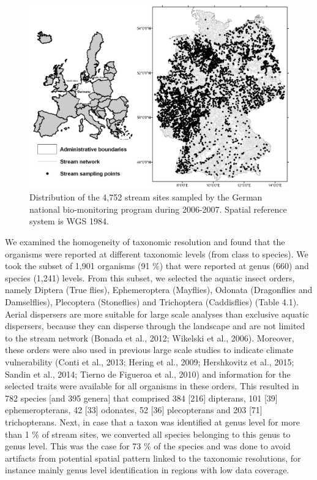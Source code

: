 \begin{figure}[t]
  \centering
  \includegraphics[width=\textwidth]{Figures/Fig_4_1.png}
  \caption{Distribution of the 4,752 stream sites sampled by the German national bio-monitoring program during 2006-2007. Spatial reference system is WGS 1984.}
  \label{Fig_4_1}
\end{figure}

We examined the homogeneity of taxonomic resolution and found that the organisms were reported at different taxonomic levels (from class to species). We took the subset of 1,901 organisms (91 \%) that were reported at genus (660) and species (1,241) levels. From this subset, we selected the aquatic insect orders, namely Diptera (True flies), Ephemeroptera (Mayflies), Odonata (Dragonflies and Damselflies), Plecoptera (Stoneflies) and Trichoptera (Caddisflies) (Table 4.1). Aerial dispersers are more suitable for large scale analyses than exclusive aquatic dispersers, because they can disperse through the landscape and are not limited to the stream network (Bonada et al., 2012; Wikelski et al., 2006). Moreover, these orders were also used in previous large scale studies to indicate climate vulnerability (Conti et al., 2013; Hering et al., 2009; Hershkovitz et al., 2015; Sandin et al., 2014; Tierno de Figueroa et al., 2010) and information for the selected traits were available for all organisms in these orders. This resulted in 782 species [and 395 genera] that comprised 384 [216] dipterans, 101 [39] ephemeropterans, 42 [33] odonates, 52 [36] plecopterans and 203 [71] trichopterans. Next, in case that a taxon was identified at genus level for more than 1 \% of stream sites, we converted all species belonging to this genus to genus level. This was the case for 73 \% of the species and was done to avoid artifacts from potential spatial pattern linked to the taxonomic resolutions, for instance mainly genus level identification in regions with low data coverage.

